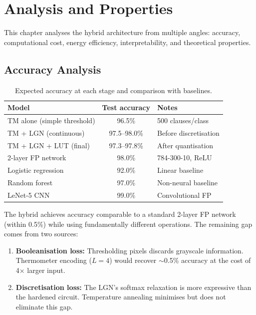 \chapter{Analysis and Properties}
\label{ch:analysis}

This chapter analyses the hybrid architecture from multiple
angles: accuracy, computational cost, energy efficiency,
interpretability, and theoretical properties.


\section{Accuracy Analysis}
\label{sec:accuracy-analysis}

\begin{table}[htbp]
\centering
\caption{Expected accuracy at each stage and comparison with
  baselines.}
\label{tab:accuracy-analysis}
\begin{tabular}{@{}lcl@{}}
  \toprule
  \textbf{Model} & \textbf{Test accuracy} & \textbf{Notes} \\
  \midrule
  TM alone (simple threshold) & 96.5\% & 500 clauses/class \\
  TM + LGN (continuous) & 97.5--98.0\% & Before discretisation \\
  TM + LGN + LUT (final) & 97.3--97.8\% & After quantisation \\
  \midrule
  2-layer FP network & 98.0\% & 784-300-10, ReLU \\
  Logistic regression & 92.0\% & Linear baseline \\
  Random forest & 97.0\% & Non-neural baseline \\
  LeNet-5 CNN & 99.0\% & Convolutional FP \\
  \bottomrule
\end{tabular}
\end{table}

The hybrid achieves accuracy comparable to a standard 2-layer FP
network (within 0.5\%) while using fundamentally different
operations. The remaining gap comes from two sources:

\begin{enumerate}
  \item \textbf{Booleanisation loss:} Thresholding pixels discards
    grayscale information. Thermometer encoding ($L = 4$) would
    recover $\sim$0.5\% accuracy at the cost of 4$\times$ larger input.

  \item \textbf{Discretisation loss:} The LGN's softmax relaxation
    is more expressive than the hardened circuit. Temperature
    annealing minimises but does not eliminate this gap.
\end{enumerate}


